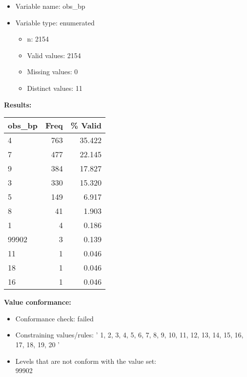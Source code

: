 \documentclass[
]{article}
\providecommand{\tightlist}{%
  \setlength{\itemsep}{0pt}\setlength{\parskip}{0pt}}
\begin{document}
\begin{itemize}
\tightlist
\item
  Variable name: obs\_bp
\item
  Variable type: enumerated

  \begin{itemize}
  \tightlist
  \item
    n: 2154
  \item
    Valid values: 2154
  \item
    Missing values: 0
  \item
    Distinct values: 11
  \end{itemize}
\end{itemize}

\textbf{Results:}\\

\begin{table}[H]
\centering
\begin{tabular}{l|r|r}
\hline
\textbf{obs\_bp} & \textbf{Freq} & \textbf{\% Valid}\\
\hline
4 & 763 & 35.422\\
\hline
7 & 477 & 22.145\\
\hline
9 & 384 & 17.827\\
\hline
3 & 330 & 15.320\\
\hline
5 & 149 & 6.917\\
\hline
8 & 41 & 1.903\\
\hline
1 & 4 & 0.186\\
\hline
99902 & 3 & 0.139\\
\hline
11 & 1 & 0.046\\
\hline
18 & 1 & 0.046\\
\hline
16 & 1 & 0.046\\
\hline
\end{tabular}
\end{table}

\textbf{Value conformance:}

\begin{itemize}
\tightlist
\item
  Conformance check: failed
\item
  Constraining values/rules: ' 1, 2, 3, 4, 5, 6, 7, 8, 9, 10, 11, 12,
  13, 14, 15, 16, 17, 18, 19, 20 '
\item
  Levels that are not conform with the value set:\\
  99902
\end{itemize}

\newpage
\end{document}
